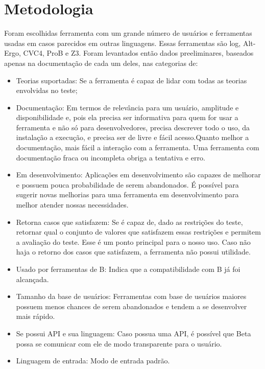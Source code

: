 \chapter{Metodologia}\label{chp:LABEL_CHP_3}

Foram escolhidas ferramenta com um grande número de usuários e ferramentas usadas em casos parecidos em outras linguagens. Essas ferramentas são {log}, Alt-Ergo, CVC4,  ProB e Z3. Foram levantados então dados preeliminares, baseados apenas na documentação de cada um deles, nas categorias de:
\begin{itemize}
	\item Teorias suportadas: Se a ferramenta é capaz de lidar com todas as teorias envolvidas no teste;
	\item Documentação: Em termos de relevância para um usuário, amplitude e disponibilidade e, pois ela precisa ser informativa para quem for usar a ferramenta e não só para desenvolvedores, precisa descrever todo o uso, da instalação a execução, e precisa ser de livre e fácil acesso.Quanto melhor a documentação, mais fácil a interação com a ferramenta. Uma ferramenta com documentação fraca ou incompleta obriga a tentativa e erro.	
	\item Em desenvolvimento: Aplicações em desenvolvimento são capazes de melhorar e possuem pouca probabilidade de serem abandonados. É possível para sugerir novas melhorias para uma ferramenta em desenvolvimento para melhor atender nossas necessidades.
	\item Retorna casos que satisfazem:  Se é capaz de, dado as restrições do teste, retornar qual o conjunto de valores que satisfazem essas restrições e permitem a avaliação do teste. Esse é  um ponto principal para o nosso uso. Caso não haja o retorno dos casos que satisfazem, a ferramenta não possui utilidade.
	\item Usado por ferramentas de B: Indica que a compatibilidade com B já foi alcançada.
	\item Tamanho da base de usuários: Ferramentas com base de usuários maiores possuem menos chances de serem abandonados e tendem a se desenvolver mais rápido.
	\item Se possui API e sua linguagem: Caso possua uma API, é possível que Beta possa se comunicar com ele de modo transparente para o usuário.
	\item Linguagem de entrada: Modo de entrada padrão.
\end{itemize}